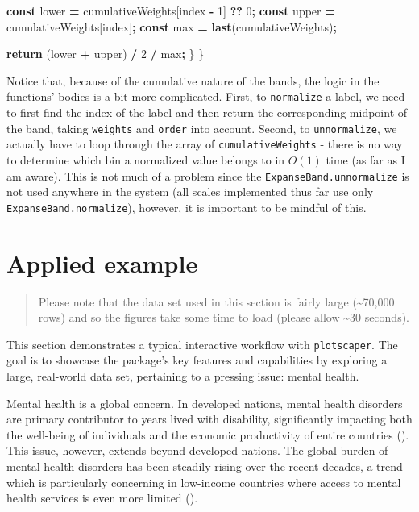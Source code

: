 \documentclass[
]{book}
\newenvironment{Shaded}{\begin{snugshade}}{\end{snugshade}}
\newcommand{\ControlFlowTok}[1]{\textcolor[rgb]{0.13,0.29,0.53}{\textbf{#1}}}
\newcommand{\DecValTok}[1]{\textcolor[rgb]{0.00,0.00,0.81}{#1}}
\newcommand{\FunctionTok}[1]{\textcolor[rgb]{0.13,0.29,0.53}{\textbf{#1}}}
\newcommand{\KeywordTok}[1]{\textcolor[rgb]{0.13,0.29,0.53}{\textbf{#1}}}
\newcommand{\NormalTok}[1]{#1}
\newcommand{\OperatorTok}[1]{\textcolor[rgb]{0.81,0.36,0.00}{\textbf{#1}}}
\theoremstyle{definition}
\theoremstyle{definition}
\theoremstyle{definition}
\theoremstyle{definition}
\theoremstyle{remark}
\begin{document}
\begin{Shaded}
\begin{Highlighting}[]
    \KeywordTok{const}\NormalTok{ lower }\OperatorTok{=}\NormalTok{ cumulativeWeights[index }\OperatorTok{{-}} \DecValTok{1}\NormalTok{] }\OperatorTok{??} \DecValTok{0}\OperatorTok{;}
    \KeywordTok{const}\NormalTok{ upper }\OperatorTok{=}\NormalTok{ cumulativeWeights[index]}\OperatorTok{;}
    \KeywordTok{const}\NormalTok{ max }\OperatorTok{=} \FunctionTok{last}\NormalTok{(cumulativeWeights)}\OperatorTok{;}

    \ControlFlowTok{return}\NormalTok{ (lower }\OperatorTok{+}\NormalTok{ upper) }\OperatorTok{/} \DecValTok{2} \OperatorTok{/}\NormalTok{ max}\OperatorTok{;}
\NormalTok{  \}}
\NormalTok{\}}
\end{Highlighting}
\end{Shaded}

Notice that, because of the cumulative nature of the bands, the logic in the functions' bodies is a bit more complicated. First, to \texttt{normalize} a label, we need to first find the index of the label and then return the corresponding midpoint of the band, taking \texttt{weights} and \texttt{order} into account. Second, to \texttt{unnormalize}, we actually have to loop through the array of \texttt{cumulativeWeights} - there is no way to determine which bin a normalized value belongs to in \(O(1)\) time (as far as I am aware). This is not much of a problem since the \texttt{ExpanseBand.unnormalize} is not used anywhere in the system (all scales implemented thus far use only \texttt{ExpanseBand.normalize}), however, it is important to be mindful of this.

\chapter{Applied example}\label{applied-example}

\begin{quote}
Please note that the data set used in this section is fairly large (\textasciitilde70,000 rows) and so the figures take some time to load (please allow \textasciitilde30 seconds).
\end{quote}

This section demonstrates a typical interactive workflow with \texttt{plotscaper}. The goal is to showcase the package's key features and capabilities by exploring a large, real-world data set, pertaining to a pressing issue: mental health.

Mental health is a global concern. In developed nations, mental health disorders are primary contributor to years lived with disability, significantly impacting both the well-being of individuals and the economic productivity of entire countries (). This issue, however, extends beyond developed nations. The global burden of mental health disorders has been steadily rising over the recent decades, a trend which is particularly concerning in low-income countries where access to mental health services is even more limited ().
\end{document}
